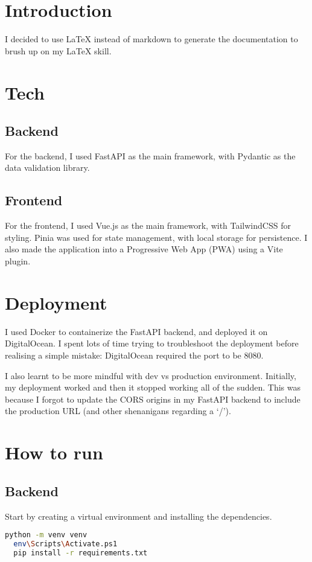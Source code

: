 \documentclass{article}
\begin{document}
\section{Introduction}
I decided to use LaTeX instead of markdown to generate the documentation to brush up on my LaTeX skill.

\section{Tech}
\subsection{Backend}
For the backend, I used FastAPI as the main framework, with Pydantic as the data validation library.

\subsection{Frontend}
For the frontend, I used Vue.js as the main framework, with TailwindCSS for styling. Pinia was used for state management, with local storage for persistence. I also made the application into a Progressive Web App (PWA) using a Vite plugin.

\section{Deployment}
I used Docker to containerize the FastAPI backend, and deployed it on DigitalOcean. I spent lots of time trying to troubleshoot the deployment before realising a simple mistake: DigitalOcean required the port to be 8080.


I also learnt to be more mindful with dev vs production environment. Initially, my deployment worked and then it stopped working all of the sudden. This was because I forgot to update the CORS origins in my FastAPI backend to include the production URL (and other shenanigans regarding a `/').

\pagebreak

\section{How to run}
\subsection{Backend}
Start by creating a virtual environment and installing the dependencies.

\begin{lstlisting}[language=bash]
  python -m venv venv
  env\Scripts\Activate.ps1
  pip install -r requirements.txt
\end{lstlisting}
\end{document}
